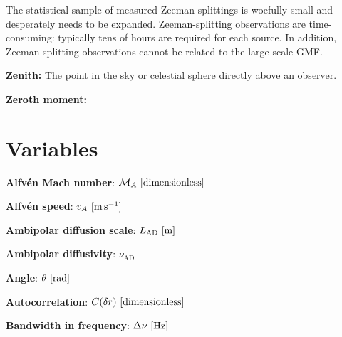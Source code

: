 \documentclass[a4paper,10pt]{article}
\begin{document}
{\noindent}The statistical sample of measured Zeeman splittings is woefully small and desperately needs to be expanded. Zeeman-splitting observations are time-consuming: typically tens of hours are required for each source. In addition, Zeeman splitting observations cannot be related to the large-scale GMF.

{\noindent}\textbf{Zenith:} The point in the sky or celestial sphere directly above an observer.

{\noindent}\textbf{Zeroth moment:} 









































\newpage
\section{Variables}

{\noindent}\textbf{Alfv\'en Mach number}: $\mathcal{M}_A~[{\rm dimensionless}]$

{\noindent}\textbf{Alfv\'en speed}: $v_A~[{\rm m\,s^{-1}}]$

{\noindent}\textbf{Ambipolar diffusion scale}: $L_\mathrm{AD}~[{\rm m}]$

{\noindent}\textbf{Ambipolar diffusivity}: $\nu_\mathrm{AD}$

{\noindent}\textbf{Angle}: $\theta~[{\rm rad}]$

{\noindent}\textbf{Autocorrelation}: $C(\delta r)~[{\rm dimensionless}]$

{\noindent}\textbf{Bandwidth in frequency}: $\Delta\nu~[{\rm Hz}]$
\end{document}
